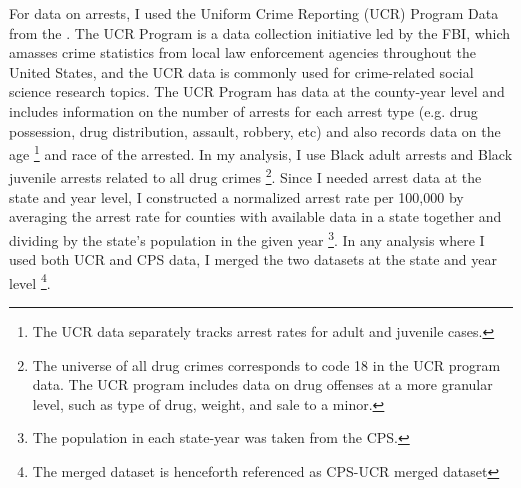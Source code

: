 \documentclass{article}
\begin{document}
For data on arrests, I used the Uniform Crime Reporting (UCR) Program Data from the \cite{ucr}. The UCR Program is a data collection initiative led by the FBI, which amasses crime statistics from local law enforcement agencies throughout the United States, and the UCR data is commonly used for crime-related social science research topics. The UCR Program has data at the county-year level and includes information on the number of arrests for each arrest type (e.g. drug possession, drug distribution, assault, robbery, etc) and also records data on the age \footnote{The UCR data separately tracks arrest rates for adult and juvenile cases.} and race of the arrested. In my analysis, I use Black adult arrests and Black juvenile arrests related to all drug crimes \footnote{The universe of all drug crimes corresponds to code 18 in the UCR program data. The UCR program includes data on drug offenses at a more granular level, such as type of drug, weight, and sale to a minor.}. Since I needed arrest data at the state and year level, I constructed a normalized arrest rate per 100,000 by averaging the arrest rate for counties with available data in a state together and dividing by the state's population in the given year \footnote{The population in each state-year was taken from the CPS.}. In any analysis where I used both UCR and CPS data, I merged the two datasets at the state and year level \footnote{The merged dataset is henceforth referenced as CPS-UCR merged dataset}.
\end{document}
